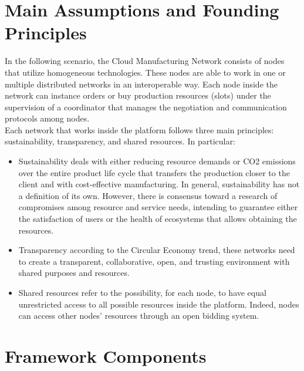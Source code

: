\section{Main Assumptions and Founding Principles}
\label{chapter3-sec2}
In the following scenario, the Cloud Manufacturing Network consists of nodes that utilize homogeneous technologies. These nodes are able to work in one or multiple distributed networks in an interoperable way. Each node inside the network can instance orders or buy production resources (slots) under the supervision of a coordinator that manages the negotiation and communication protocols among nodes.\\
Each network that works inside the platform follows three main principles: sustainability, transparency, and shared resources. In particular:
\begin{itemize}
    \item Sustainability deals with either reducing resource demands or CO2 emissions over the entire product life cycle that transfers the production closer to the client and with cost-effective manufacturing. In general, sustainability has not a definition of its own. However, there is consensus toward a research of compromises among resource and service needs, intending to guarantee either the satisfaction of users or the health of ecosystems that allows obtaining the resources.
    \item Transparency according to the Circular Economy trend, these networks need to create a transparent, collaborative, open, and trusting environment with shared purposes and resources.
    \item Shared resources refer to the possibility, for each node, to have equal unrestricted access to all possible resources inside the platform. Indeed, nodes can access other nodes’ resources through an open bidding system.
\end{itemize}

\section{Framework Components}
